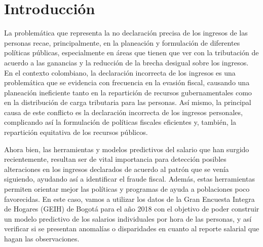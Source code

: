 \documentclass[10pt]{article}
\begin{document}

\section{Introducción} \label{sec:intro}

La problemática que representa la no declaración precisa de los ingresos de las personas recae, principalmente, en la planeación y formulación de diferentes políticas públicas, especialmente en áreas que tienen que ver con la tributación de acuerdo a las ganancias y la reducción de la brecha desigual sobre los ingresos. En el contexto colombiano, la declaración incorrecta de los ingresos es una problemática que se evidencia con frecuencia en la evasión fiscal, causando una planeación ineficiente tanto en la repartición de recursos gubernamentales como en la distribución de carga tributaria para las personas. Así mismo, la principal causa de este conflicto es la declaración incorrecta de los ingresos personales, complicando así la formulación de políticas fiscales eficientes y, también, la repartición equitativa de los recursos públicos. 


Ahora bien, las herramientas y modelos predictivos del salario que han surgido recientemente, resultan ser de vital importancia para detección posibles alteraciones en los ingresos declarados de acuerdo al patrón que se venía siguiendo, ayudando así a identificar el fraude fiscal. Además, estas herramientas permiten orientar mejor las políticas y programas de ayuda a poblaciones poco favorecidas. En este caso, vamos a utilizar los datos de la Gran Encuesta Integra de Hogares (GEIH) de Bogotá para el año 2018 con el objetivo de poder construir un modelo predictivo de los salarios individuales por hora de las personas, y así verificar si se presentan anomalías o disparidades en cuanto al reporte salarial que hagan las observaciones. 
\end{document}
